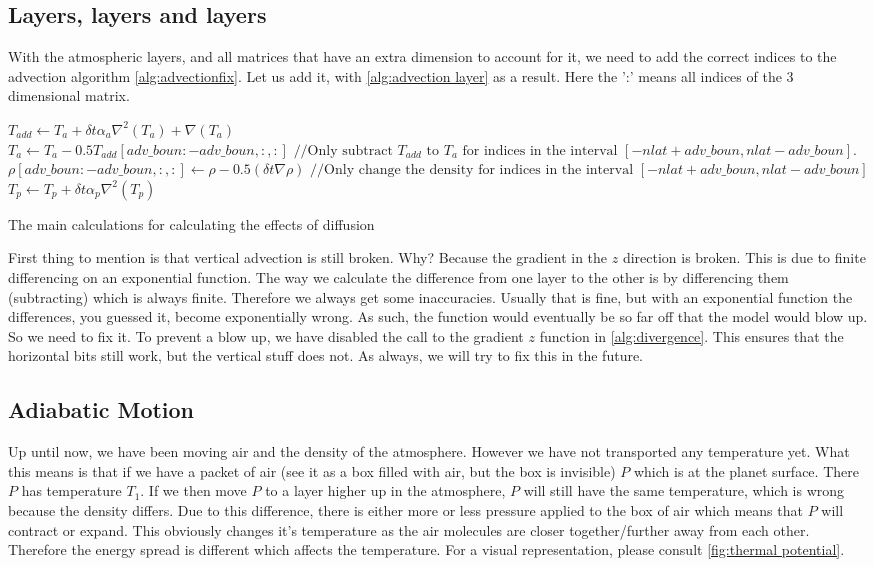 \subsection{Layers, layers and layers}
With the atmospheric layers, and all matrices that have an extra dimension to account for it, we need to add the correct indices to the advection algorithm \autoref{alg:advectionfix}. Let us 
add it, with \autoref{alg:advection layer} as a result. Here the ':' means all indices of the 3 dimensional matrix. 

\begin{algorithm}
    $T_{add} \leftarrow T_a + \delta t \alpha_a \nabla^2(T_a) + \nabla(T_a)$ \;
    $T_a \leftarrow T_a - 0.5T_{add}[adv\_boun:-adv\_boun, :, :] \text{ //Only subtract } T_{add} \text{ to } T_a \text{ for indices in the interval } [-nlat + adv\_boun, nlat - adv\_boun]$. \;
    $\rho[adv\_boun: -adv\_boun, :, :] \leftarrow \rho - 0.5(\delta t \nabla \rho) \text{ //Only change the density for indices in the interval } [-nlat + adv\_boun, nlat - adv\_boun]$ \;
    $T_p \leftarrow T_p + \delta t \alpha_p \nabla^2(T_p)$ \;
    \caption{The main calculations for calculating the effects of diffusion}
    \label{alg:advection layer}
\end{algorithm}

First thing to mention is that vertical advection is still broken. Why? Because the gradient in the $z$ direction is broken. This is due to finite differencing on an exponential function. The way
we calculate the difference from one layer to the other is by differencing them (subtracting) which is always finite. Therefore we always get some inaccuracies. Usually that is fine, but with an 
exponential function the differences, you guessed it, become exponentially wrong. As such, the function would eventually be so far off that the model would blow up. So we need to fix it. To 
prevent a blow up, we have disabled the call to the gradient $z$ function in \autoref{alg:divergence}. This ensures that the horizontal bits still work, but the vertical stuff does not.
As always, we will try to fix this in the future. 

\subsection{Adiabatic Motion}
Up until now, we have been moving air and the density of the atmosphere. However we have not transported any temperature yet. What this means is that if we have a packet of air (see it as a box
filled with air, but the box is invisible) $P$ which is at the planet surface. There $P$ has temperature $T_1$. If we then move $P$ to a layer higher up in the atmosphere, $P$ will still have 
the same temperature, which is wrong because the density differs. Due to this difference, there is either more or less pressure applied to the box of air which means that $P$ will contract or 
expand. This obviously changes it's temperature as the air molecules are closer together/further away from each other. Therefore the energy spread is different which affects the temperature. 
For a visual representation, please consult \autoref{fig:thermal potential}.

